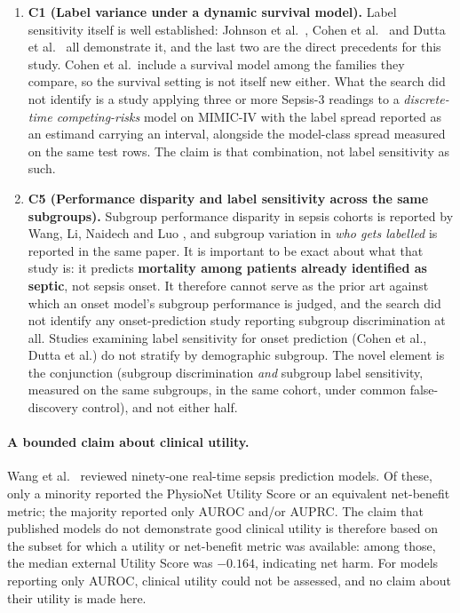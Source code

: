 \begin{enumerate}
    \item \textbf{C1 (Label variance under a dynamic survival model).} Label
    sensitivity itself is well established: Johnson et al.\
    \cite{johnson2018comparative}, Cohen et al.\ \cite{cohen2024subtle} and
    Dutta et al.\ \cite{dutta2026performance} all demonstrate it, and the last
    two are the direct precedents for this study. Cohen et al.\ include a
    survival model among the families they compare, so the survival setting is
    not itself new either. What the search did not identify is a study applying
    three or more Sepsis-3 readings to a \emph{discrete-time competing-risks}
    model on MIMIC-IV with the label spread reported as an estimand carrying an
    interval, alongside the model-class spread measured on the same test rows.
    The claim is that combination, not label sensitivity as such.

    \item \textbf{C5 (Performance disparity and label sensitivity across the
    same subgroups).} Subgroup performance disparity in sepsis cohorts is
    reported by Wang, Li, Naidech and Luo \cite{wang2022equity}, and subgroup
    variation in \emph{who gets labelled} is reported in the same paper. It is
    important to be exact about what that study is: it predicts
    \textbf{mortality among patients already identified as septic}, not sepsis
    onset. It therefore cannot serve as the prior art against which an onset
    model's subgroup performance is judged, and the search did not identify any
    onset-prediction study reporting subgroup discrimination at all. Studies
    examining label sensitivity for onset prediction (Cohen et al., Dutta et
    al.) do not stratify by demographic subgroup. The novel element is the
    conjunction (subgroup discrimination \emph{and} subgroup label
    sensitivity, measured on the same subgroups, in the same cohort, under
    common false-discovery control), and not either half.
\end{enumerate}

\paragraph{A bounded claim about clinical utility.}
Wang et al.\ \cite{wang2025srpm} reviewed ninety-one real-time sepsis
prediction models. Of these, only a minority reported the PhysioNet Utility
Score or an equivalent net-benefit metric; the majority reported only AUROC
and/or AUPRC. The claim that published models do not demonstrate good clinical
utility is therefore based on the subset for which a utility or net-benefit
metric was available: among those, the median external Utility Score was
$-0.164$, indicating net harm. For models reporting only AUROC, clinical
utility could not be assessed, and no claim about their utility is made here.

